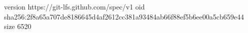 version https://git-lfs.github.com/spec/v1
oid sha256:2f8a65a707de8186645d4af2612cc381a93484ab66f88ef5b6ee00a5cb659e44
size 6520
